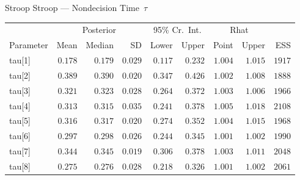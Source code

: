 \documentclass[aspectratio=169]{beamer}
\begin{document}
\begin{frame}[fragile]{Stroop Stroop --- Nondecision Time~$\tau$}
\begin{table}[h]
	\centering\scriptsize
	\label{tab:mCMCSummary}
	{
		\begin{tabular}{lrrrrrrrr}
			\toprule
			\multicolumn{1}{c}{} & \multicolumn{3}{c}{Posterior} & \multicolumn{2}{c}{95\% Cr.\ Int.} & \multicolumn{2}{c}{Rhat} & \multicolumn{1}{c}{} \\
			\cline{2-4}\cline{5-6}\cline{7-8}
			Parameter & Mean & Median & SD & Lower & Upper & Point & Upper & ESS  \\
			\cmidrule[0.4pt]{1-9}
			tau[1] & $0.178$ & $0.179$ & $0.029$ & $0.117$ & $0.232$ & $1.004$ & $1.015$ & $1917$  \\
			tau[2] & $0.389$ & $0.390$ & $0.020$ & $0.347$ & $0.426$ & $1.002$ & $1.008$ & $1888$  \\
			tau[3] & $0.321$ & $0.323$ & $0.028$ & $0.264$ & $0.372$ & $1.003$ & $1.006$ & $1966$  \\
			tau[4] & $0.313$ & $0.315$ & $0.035$ & $0.241$ & $0.378$ & $1.005$ & $1.018$ & $2108$  \\
			tau[5] & $0.316$ & $0.317$ & $0.020$ & $0.274$ & $0.352$ & $1.004$ & $1.015$ & $1968$  \\
			tau[6] & $0.297$ & $0.298$ & $0.026$ & $0.244$ & $0.345$ & $1.001$ & $1.002$ & $1990$  \\
			tau[7] & $0.344$ & $0.345$ & $0.019$ & $0.306$ & $0.378$ & $1.003$ & $1.011$ & $2048$  \\
			tau[8] & $0.275$ & $0.276$ & $0.028$ & $0.218$ & $0.326$ & $1.001$ & $1.002$ & $2061$  \\
			\bottomrule
		\end{tabular}
	}
\end{table}
\end{frame}
\end{document}
